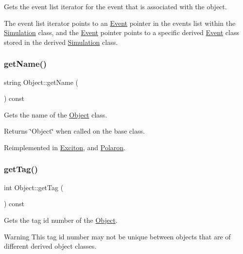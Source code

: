 Gets the event list iterator for the event that is associated with the object. 

The event list iterator points to an \hyperlink{class_event}{Event} pointer in the events list within the \hyperlink{class_simulation}{Simulation} class, and the \hyperlink{class_event}{Event} pointer points to a specific derived \hyperlink{class_event}{Event} class stored in the derived \hyperlink{class_simulation}{Simulation} class. \mbox{\label{class_object_ade517616d51cd9ab581ec5afeb37b313}} 
\subsubsection{\texorpdfstring{get\+Name()}{getName()}}
{\footnotesize\ttfamily string Object\+::get\+Name (\begin{DoxyParamCaption}{ }\end{DoxyParamCaption}) const\hspace{0.3cm}{\ttfamily [virtual]}}



Gets the name of the \hyperlink{class_object}{Object} class. 

\begin{DoxyReturn}{Returns}
\char`\"{}\+Object\char`\"{} when called on the base class. 
\end{DoxyReturn}


Reimplemented in \hyperlink{class_exciton_a4db43bd7ca4136e35f9a50b2a5854728}{Exciton}, and \hyperlink{class_polaron_ab30575f6248183c9dab4d257df2f91fc}{Polaron}.

\mbox{\label{class_object_aa9653577e8d0ac4b7b86d23d12f8b31b}} 
\subsubsection{\texorpdfstring{get\+Tag()}{getTag()}}
{\footnotesize\ttfamily int Object\+::get\+Tag (\begin{DoxyParamCaption}{ }\end{DoxyParamCaption}) const}



Gets the tag id number of the \hyperlink{class_object}{Object}. 

\begin{DoxyWarning}{Warning}
This tag id number may not be unique between objects that are of different derived object classes. 
\end{DoxyWarning}
\mbox{\label{class_object_a3d7c877f4aa179d9a56050c5faddc18d}} 
